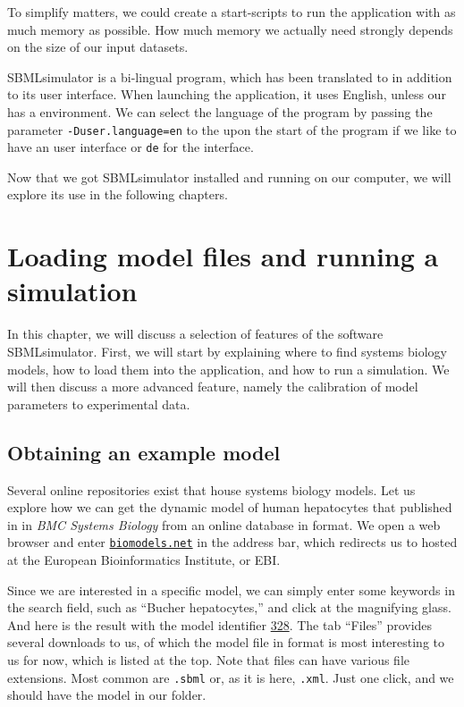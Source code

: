 To simplify matters, we could create a start-scripts to run the application with as much memory as possible.
How much memory we actually need strongly depends on the size of our input datasets.

SBMLsimulator is a bi-lingual program, which has been translated to \German in addition to its \English user interface.
When launching the application, it uses English, unless our \OS has a \German environment.
We can select the language of the program by passing the parameter \texttt{-Duser.language=en} to the \JVM upon the start of the program if we like to have an \English user interface or \texttt{de} for the \German interface.

Now that we got SBMLsimulator installed and running on our computer, we will explore its use in the following chapters.


\chapter{Loading model files and running a simulation}%

In this chapter, we will discuss a selection of features of the software SBMLsimulator.
First, we will start by explaining where to find systems biology models, how to load them into the application, and how to run a simulation.
We will then discuss a more advanced feature, namely the calibration of model parameters to experimental data.

\section{Obtaining an example model}

Several online repositories exist that house systems biology models.
Let us explore how we can get the dynamic model of human hepatocytes that \citeauthor{Bucher2011} published in \citeyear{Bucher2011} in \emph{BMC Systems Biology} from an online database in \SBML format.
We open a web browser and enter \href{http://www.ebi.ac.uk/biomodels/}{\texttt{biomodels.net}} in the address bar, which redirects us to \BioModels \citep{Malik-Sheriff2019} hosted at the European Bioinformatics Institute, or EBI.

Since we are interested in a specific model, we can simply enter some keywords in the search field, such as ``Bucher hepatocytes,'' and click at the magnifying glass.
And here is the result with the model identifier \numero \href{https://identifiers.org/biomodels.db/BIOMD0000000328}{328}.
The tab ``Files'' provides several downloads to us, of which the model file in \SBML format is most interesting to us for now, which is listed at the top.
Note that \SBML files can have various file extensions.
Most common are \texttt{.sbml} or, as it is here, \texttt{.xml}.
Just one click, and we should have the model in our  folder.

